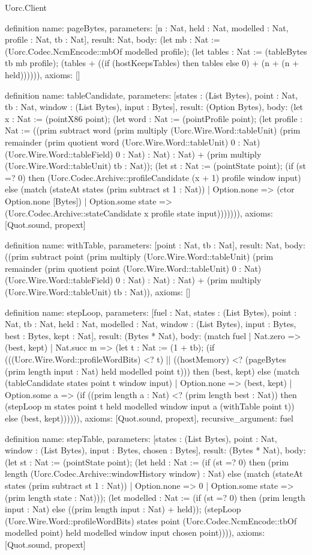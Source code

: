 \begin{lexlean}{Uorc.Client}
\begin{semanticmodule}
definition{
  name: pageBytes,
  parameters: [n : Nat, held : Nat, modelled : Nat, profile : Nat, tb : Nat],
  result: Nat,
  body: (let mb : Nat := (Uorc.Codec.NcmEncode::mbOf modelled profile); (let tables : Nat := (tableBytes tb mb profile); (tables + ((if (hostKeepsTables) then tables else 0) + (n + (n + held)))))),
  axioms: []
}

definition{
  name: tableCandidate,
  parameters: [states : (List Bytes), point : Nat, tb : Nat, window : (List Bytes), input : Bytes],
  result: (Option Bytes),
  body: (let x : Nat := (pointX86 point); (let word : Nat := (pointProfile point); (let profile : Nat := ((prim subtract word (prim multiply (Uorc.Wire.Word::tableUnit) (prim remainder (prim quotient word (Uorc.Wire.Word::tableUnit) 0 : Nat) (Uorc.Wire.Word::tableField) 0 : Nat) : Nat) : Nat) + (prim multiply (Uorc.Wire.Word::tableUnit) tb : Nat)); (let st : Nat := (pointState point); (if (st =? 0) then (Uorc.Codec.Archive::profileCandidate (x + 1) profile window input) else (match (stateAt states (prim subtract st 1 : Nat))
    | Option.none => (ctor Option.none [Bytes])
    | Option.some state => (Uorc.Codec.Archive::stateCandidate x profile state input))))))),
  axioms: [Quot.sound, propext]
}

definition{
  name: withTable,
  parameters: [point : Nat, tb : Nat],
  result: Nat,
  body: ((prim subtract point (prim multiply (Uorc.Wire.Word::tableUnit) (prim remainder (prim quotient point (Uorc.Wire.Word::tableUnit) 0 : Nat) (Uorc.Wire.Word::tableField) 0 : Nat) : Nat) : Nat) + (prim multiply (Uorc.Wire.Word::tableUnit) tb : Nat)),
  axioms: []
}

definition{
  name: stepLoop,
  parameters: [fuel : Nat, states : (List Bytes), point : Nat, tb : Nat, held : Nat, modelled : Nat, window : (List Bytes), input : Bytes, best : Bytes, kept : Nat],
  result: (Bytes * Nat),
  body: (match fuel
    | Nat.zero => (best, kept)
    | Nat.succ m => (let t : Nat := (1 + tb); (if (((Uorc.Wire.Word::profileWordBits) <? t) || ((hostMemory) <? (pageBytes (prim length input : Nat) held modelled point t))) then (best, kept) else (match (tableCandidate states point t window input)
      | Option.none => (best, kept)
      | Option.some a => (if ((prim length a : Nat) <? (prim length best : Nat)) then (stepLoop m states point t held modelled window input a (withTable point t)) else (best, kept)))))),
  axioms: [Quot.sound, propext],
  recursive_argument: fuel
}

definition{
  name: stepTable,
  parameters: [states : (List Bytes), point : Nat, window : (List Bytes), input : Bytes, chosen : Bytes],
  result: (Bytes * Nat),
  body: (let st : Nat := (pointState point); (let held : Nat := (if (st =? 0) then (prim length (Uorc.Codec.Archive::windowHistory window) : Nat) else (match (stateAt states (prim subtract st 1 : Nat))
    | Option.none => 0
    | Option.some state => (prim length state : Nat))); (let modelled : Nat := (if (st =? 0) then (prim length input : Nat) else ((prim length input : Nat) + held)); (stepLoop (Uorc.Wire.Word::profileWordBits) states point (Uorc.Codec.NcmEncode::tbOf modelled point) held modelled window input chosen point)))),
  axioms: [Quot.sound, propext]
}


\end{semanticmodule}
\end{lexlean}
